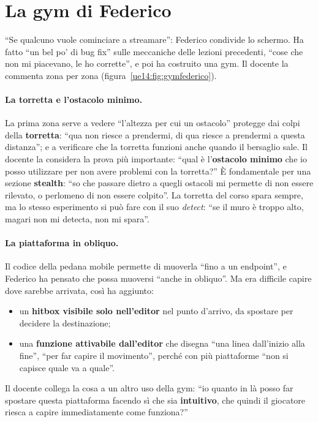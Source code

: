 \section{La gym di Federico}
\label{ue14:sec:gymfederico}

``Se qualcuno vuole cominciare a streamare'': Federico condivide lo schermo. Ha fatto ``un
bel po' di bug fix'' sulle meccaniche delle lezioni precedenti, ``cose che non mi
piacevano, le ho corrette'', e poi ha costruito una gym. Il docente la commenta zona per
zona (figura~\ref{ue14:fig:gymfederico}).

\paragraph{La torretta e l'ostacolo minimo.} La prima zona serve a vedere ``l'altezza per
cui un ostacolo'' protegge dai colpi della \textbf{torretta}: ``qua non riesce a prendermi,
di qua riesce a prendermi a questa distanza''; e a verificare che la torretta funzioni
anche quando il bersaglio sale. Il docente la considera la prova più importante: ``qual è
l'\textbf{ostacolo minimo} che io posso utilizzare per non avere problemi con la
torretta?'' È fondamentale per una sezione \textbf{stealth}: ``so che passare dietro a
quegli ostacoli mi permette di non essere rilevato, o perlomeno di non essere colpito''. La
torretta del corso spara sempre, ma lo stesso esperimento si può fare con il suo
\emph{detect}: ``se il muro è troppo alto, magari non mi detecta, non mi spara''.

\paragraph{La piattaforma in obliquo.} Il codice della pedana mobile permette di muoverla
``fino a un endpoint'', e Federico ha pensato che possa muoversi ``anche in obliquo''. Ma era
difficile capire dove sarebbe arrivata, così ha aggiunto:
\begin{itemize}
  \item un \textbf{hitbox visibile solo nell'editor} nel punto d'arrivo, da spostare per
        decidere la destinazione;
  \item una \textbf{funzione attivabile dall'editor} che disegna ``una linea dall'inizio
        alla fine'', ``per far capire il movimento'', perché con più piattaforme ``non si
        capisce quale va a quale''.
\end{itemize}
Il docente collega la cosa a un altro uso della gym: ``io quanto in là posso far spostare
questa piattaforma facendo sì che sia \textbf{intuitivo}, che quindi il giocatore riesca a
capire immediatamente come funziona?''

